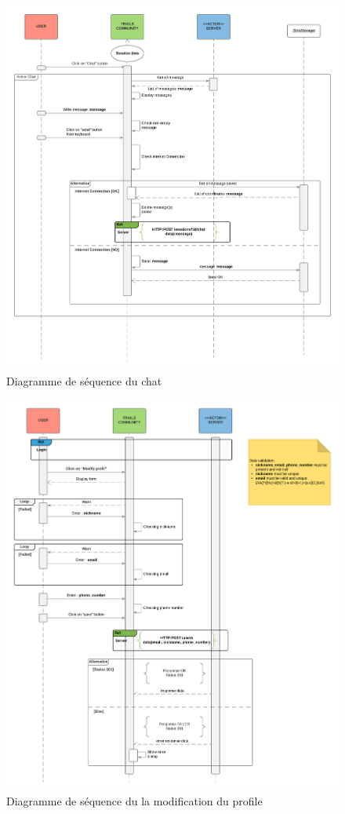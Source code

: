 \documentclass[titlepage, 12pt]{report}
\begin{document}
\begin{figure}[!h]
	\caption{Diagramme de séquence du chat}
	\label{chat_sequence_diagram}
	\centering
	\includegraphics[scale=0.7]{Images/diagram/chat_sequence_diagram.png}
\end{figure}

\begin{figure}[!h]
	\caption{Diagramme de séquence du la modification du profile}
	\label{modify_profil_sequence_diagram}
	\centering
	\includegraphics[scale=0.7]{Images/diagram/modify_profil_sequence_diagram.png}
\end{figure}
\end{document}
